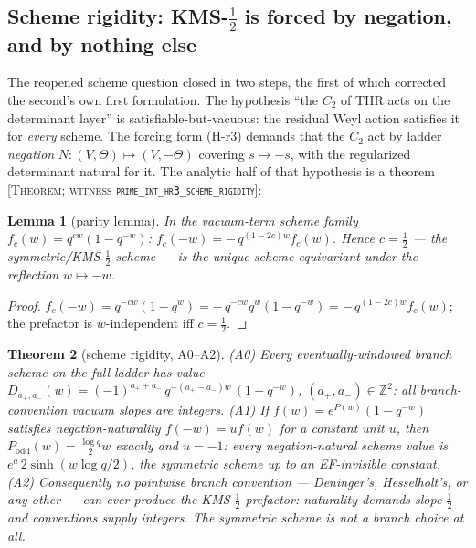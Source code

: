\documentclass[11pt,reqno]{amsart}
\theoremstyle{plain}
\newtheorem{theorem}{Theorem}[section]
\newtheorem{lemma}[theorem]{Lemma}
\theoremstyle{definition}
\theoremstyle{remark}
\newcommand{\Z}{\mathbb{Z}}
\newcommand{\grade}[1]{\textup{[\textsc{#1}]}}
\begin{document}
\subsection{Scheme rigidity: KMS-\texorpdfstring{$\tfrac12$}{1/2} is forced by negation,
and by nothing else}\label{subsec:rigidity}

The reopened scheme question closed in two steps, the first of which corrected the second's
own first formulation. The hypothesis ``the $C_2$ of THR acts on the determinant layer''
is satisfiable-but-vacuous: the residual Weyl action satisfies it for \emph{every} scheme.
The forcing form (H-r3) demands that the $C_2$ act by ladder \emph{negation}
$N : (V, \Theta) \mapsto (V, -\Theta)$ covering $s \mapsto -s$, with the regularized
determinant natural for it. The analytic half of that hypothesis is a theorem
\grade{Theorem; witness \texttt{prime\_\allowbreak int\_\allowbreak hr3\_\allowbreak scheme\_\allowbreak rigidity}}:

\begin{lemma}[parity lemma]\label{lem:parity}
In the vacuum-term scheme family $f_c(w) = q^{cw}(1 - q^{-w})$:
$f_c(-w) = -\,q^{(1-2c)w} f_c(w)$. Hence $c = \tfrac12$ --- the symmetric/KMS-$\tfrac12$
scheme --- is the unique scheme equivariant under the reflection $w \mapsto -w$.
\end{lemma}

\begin{proof}
$f_c(-w) = q^{-cw}(1 - q^{w}) = -\,q^{-cw} q^{w} (1 - q^{-w}) = -\,q^{(1-2c)w} f_c(w)$;
the prefactor is $w$-independent iff $c = \tfrac12$.
\end{proof}

\begin{theorem}[scheme rigidity, A0--A2]\label{thm:rigidity}
\textup{(A0)} Every eventually-windowed branch scheme on the full ladder has value
$D_{a_+,a_-}(w) = (-1)^{a_+ + a_-}\, q^{-(a_+ - a_-)w}\,(1 - q^{-w})$, $(a_+, a_-) \in \Z^2$:
all branch-convention vacuum slopes are \emph{integers}.
\textup{(A1)} If $f(w) = e^{P(w)}(1 - q^{-w})$ satisfies negation-naturality
$f(-w) = u f(w)$ for a constant unit $u$, then $P_{\mathrm{odd}}(w) = \tfrac{\log q}{2} w$
exactly and $u = -1$: every negation-natural scheme value is
$e^{a}\, 2\sinh(w \log q / 2)$, the symmetric scheme up to an EF-invisible constant.
\textup{(A2)} Consequently no pointwise branch convention --- Deninger's, Hesselholt's, or
any other --- can ever produce the KMS-$\tfrac12$ prefactor: naturality demands slope
$\tfrac12$ and conventions supply integers. The symmetric scheme is not a branch choice at
all.
\end{theorem}
\end{document}
